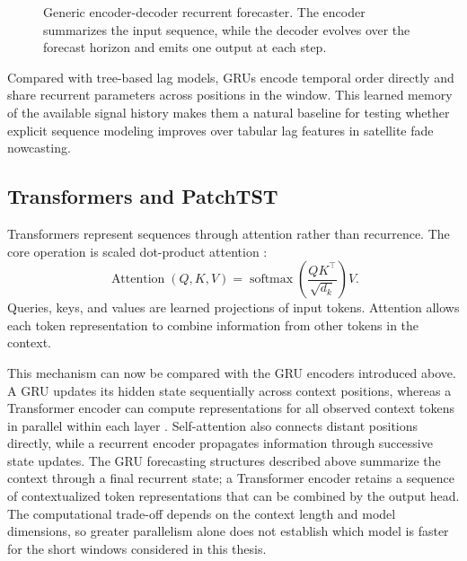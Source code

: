 \begin{figure}[htbp]

\caption{Generic encoder-decoder recurrent forecaster.
The encoder summarizes the input sequence, while the decoder evolves over
the forecast horizon and emits one output at each step.}
\label{fig:encoder-decoder-forecasting}
\end{figure}

Compared with tree-based lag models, GRUs encode temporal order directly and
share recurrent parameters across positions in the window. This learned memory
of the available signal history makes them a natural baseline for testing
whether explicit sequence modeling improves over tabular lag features in
satellite fade nowcasting.

\subsection{Transformers and PatchTST}
\label{sec:background-patchtst}

Transformers represent sequences through attention rather than recurrence. The
core operation is scaled dot-product attention \cite{vaswani2017attention}:
\[
  \operatorname{Attention}(Q,K,V)
  =
  \operatorname{softmax}
  \left(
    \frac{QK^\top}{\sqrt{d_k}}
  \right)V .
\]
Queries, keys, and values are learned projections of input tokens. Attention
allows each token representation to combine information from other tokens in
the context.

This mechanism can now be compared with the GRU encoders introduced above.
A GRU updates its hidden state sequentially across context positions, whereas
a Transformer encoder can compute representations for all observed context
tokens in parallel within each layer \cite{vaswani2017attention}. Self-attention
also connects distant positions directly, while a recurrent encoder propagates
information through successive state updates. The GRU forecasting structures
described above summarize the context through a final recurrent state; a
Transformer encoder retains a sequence of contextualized token representations
that can be combined by the output head. The computational trade-off depends on
the context length and model dimensions, so greater parallelism alone does not
establish which model is faster for the short windows considered in this thesis.

